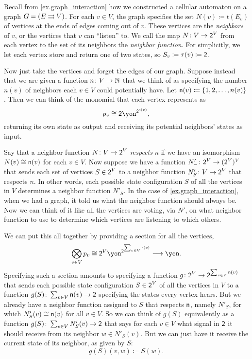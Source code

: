 \documentclass[Book-Poly]{subfiles}
\begin{document}
\begin{example}\label{ex.cell_auto_vote_interaction}
Recall from \cref{ex.graph_interaction} how we constructed a cellular automaton on a graph $G=(E\rightrightarrows V)$.
For each $v\in V$, the graph specifies the set $N(v)\coloneqq t(E_v)$ of vertices at the ends of edges coming out of $v$.
These vertices are the \emph{neighbors} of $v$, or the vertices that $v$ can ``listen'' to.
We call the map $N\colon V\to\textsf{2}^V$ from each vertex to the set of its neighbors the \emph{neighbor function}.
For simplicitly, we let each vertex store and return one of two states, so $S_v\coloneqq\tau(v)\coloneqq\textsf{2}$.

Now just take the vertices and forget the edges of our graph.
Suppose instead that we are given a function $n\colon V\to\mathbb{N}$ that we think of as specifying the number $n(v)$ of neighbors each $v\in V$ could potentially have.
Let $\mathsf{n}(v)\coloneqq\{1,2,\ldots,n(v)\}$.
Then we can think of the monomial that each vertex represents as
\[
    p_v\iso\2\yon^{\2^{\ord{n}(v)}},
\]
returning its own state as output and receiving its potential neighbors' states as input.

Say that a neighbor function $N\colon V\to\textsf{2}^V$ \emph{respects} $n$ if we have an isomorphism $N(v)\cong\mathsf{n}(v)$ for each $v\in V$.
Now suppose we have a function $N'_-\colon \textsf{2}^V\to (\textsf{2}^V)^V$ that sends each set of vertices $S\in\textsf{2}^V$ to a neighbor function $N'_S\colon V\to \textsf{2}^V$ that respects $n$.
In other words, each possible state configuration $S$ of all the vertices in $V$ determines a neighbor function $N'_S$.
In the case of \cref{ex.graph_interaction}, when we had a graph, it told us what the neighbor function should always be.
Now we can think of it like all the vertices are voting, via $N'$, on what neighbor function to use to determine which vertices are listening to which others.

We can put this all together by providing a section for all the vertices,
\begin{equation}\label{eqn.polymap_misc9237}
    \bigotimes_{v\in V}p_v\cong\2^V\yon^{\2^{\sum_{v\in V}\ord{n}(v)}}\too\yon.
\end{equation}
Specifying such a section amounts to specifying a function $g\colon \textsf{2}^V\to\textsf{2}^{\sum_{v\in V}\mathsf{n}(v)}$ that sends each possible state configuration $S\in\textsf{2}^V$ of all the vertices in $V$ to a function $g(S)\colon\sum_{v\in V}\mathsf{n}(v)\to\textsf{2}$ specifying the states every vertex hears.
But we already have a neighbor function assigned to $S$ that respects $\mathsf{n}$, namely $N'_S$, for which $N'_S(v)\cong\mathsf{n}(v)$ for all $v\in V$.
So we can think of $g(S)$ equivalently as a function $g(S)\colon\sum_{v\in V}N'_S(v)\to\textsf{2}$ that says for each $v\in V$ what signal in $\textsf{2}$ it should receive from its neighbor $w\in N'_S(v)$.
But we can just have it receive the current state of its neighbor, as given by $S$:
\[
    g(S)(v,w)\coloneqq S(w).
\]


\end{example}
\end{document}
